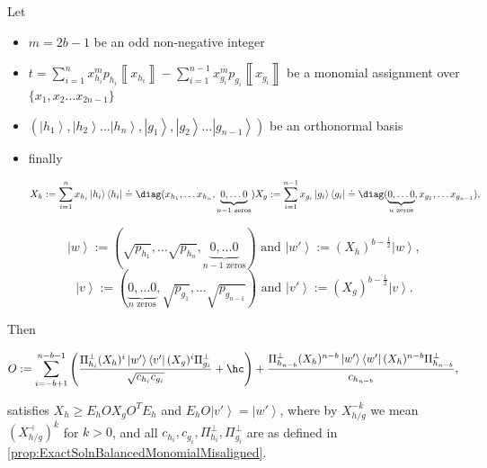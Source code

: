 \documentclass{theoretics}
\begin{document}
\begin{proposition}
  \label{prop:ExactSolnUnbalancedMonomialMisaligned}Let
  \begin{itemize}
    \item $m=2b-1$ be an odd non-negative integer
    \item $
            t=\sum_{i=1}^{n}x_{h_{i}}^{m}p_{h_{i}}\left\llbracket x_{h_{i}}\right\rrbracket -\sum_{i=1}^{n-1}x_{g_{i}}^{m}p_{g_{i}}\left\llbracket x_{g_{i}}\right\rrbracket
          $ be a monomial assignment over $\{x_{1},x_{2}\dots x_{2n-1}\}$
    \item $\left(\left|h_{1}\right\rangle ,\left|h_{2}\right\rangle \dots\left|h_{n}\right\rangle ,\left|g_{1}\right\rangle ,\left|g_{2}\right\rangle \dots\left|g_{n-1}\right\rangle \right)$
          be an orthonormal basis
    \item finally
          \begin{footnotesize}
            \begin{displaymath}
              X_{h}:=\sum_{i=1}^{n}x_{h_{i}}\left|h_{i}\right\rangle \left\langle h_{i}\right|\doteq\diag(x_{h_{1}},\dots x_{h_{n}},\underbrace{0,\dots0}_{n-1\text{ zeros}})
              X_{g}:=\sum_{i=1}^{n-1}x_{g_{i}}\left|g_{i}\right\rangle \left\langle g_{i}\right|\doteq\diag(\underbrace{0,\dots0}_{n\text{ zeros}},x_{g_{1}},\dots x_{g_{n-1}}),
            \end{displaymath}
          \end{footnotesize}\begin{displaymath}
            \left|w\right\rangle :=(\sqrt{p_{h_{1}}},\dots\sqrt{p_{h_{n}}},\underbrace{0,\dots0}_{n-1\text{ zeros}}) \text{ and }\left|w'\right\rangle :=(X_{h})^{b-\frac{1}{2}}\left|w\right\rangle,
          \end{displaymath}
          \begin{displaymath}
            \left|v\right\rangle :=(\underbrace{0,\dots0}_{n\text{ zeros}},\sqrt{p_{g_{1}}},\dots\sqrt{p_{g_{n-1}}}) \text{ and }\left|v'\right\rangle :=(X_{g})^{b-\frac{1}{2}}\left|v\right\rangle.
          \end{displaymath}

  \end{itemize}
  Then
  \begin{footnotesize}
    \begin{align*}
      O  :=\sum_{i=-b+1}^{n-b-1}\left(\frac{\Pi_{h_{i}}^{\perp}(X_{h})^{i}\left|w'\right\rangle \left\langle v'\right|(X_{g})^{i}\Pi_{g_{i}}^{\perp}}{\sqrt{c_{h_{i}}c_{g_{i}}}}+\hc\right) +\frac{\Pi_{h_{n-b}}^{\perp}(X_{h})^{n-b}\left|w'\right\rangle \left\langle w'\right|(X_{h})^{n-b}\Pi_{h_{n-b}}^{\perp}}{c_{h_{n-b}}},
    \end{align*}
  \end{footnotesize}
  satisfies $X_{h}\ge E_{h}OX_{g}O^{T}E_{h}$ and $E_{h}O\left|v'\right\rangle =\left|w'\right\rangle $,
  where by $X_{h/g}^{-k}$ we mean $(X_{h/g}^{\dashv})^{k}$
  for $k>0$, and all $c_{h_{i}},c_{g_{i}},\Pi_{h_{i}}^{\perp},\Pi_{g_{i}}^{\perp}$
  are as defined in \cref{prop:ExactSolnBalancedMonomialMisaligned}.
\end{proposition}
\end{document}
